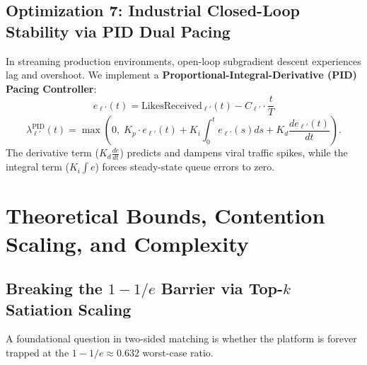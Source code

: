 \documentclass[11pt,letterpaper]{article}
\theoremstyle{definition}
\theoremstyle{plain}
\theoremstyle{remark}
\begin{document}
\subsection{Optimization 7: Industrial Closed-Loop Stability via PID Dual Pacing}
In streaming production environments, open-loop subgradient descent experiences lag and overshoot. We implement a \textbf{Proportional-Integral-Derivative (PID) Pacing Controller}:
\begin{equation}
    e_{\ell'}(t) = \text{LikesReceived}_{\ell'}(t) - C_{\ell'} \cdot \frac{t}{T}
\end{equation}
\begin{equation}
    \lambda_{\ell'}^{\text{PID}}(t) = \max\left(0, \; K_p \cdot e_{\ell'}(t) + K_i \int_0^t e_{\ell'}(s) ds + K_d \frac{de_{\ell'}(t)}{dt}\right).
\end{equation}
The derivative term ($K_d \frac{de}{dt}$) predicts and dampens viral traffic spikes, while the integral term ($K_i \int e$) forces steady-state queue errors to zero.

\newpage
\section{Theoretical Bounds, Contention Scaling, and Complexity}
\label{sec:bounds}

\subsection{Breaking the $1 - 1/e$ Barrier via Top-$k$ Satiation Scaling}
A foundational question in two-sided matching is whether the platform is forever trapped at the $1 - 1/e \approx 0.632$ worst-case ratio.
\end{document}
